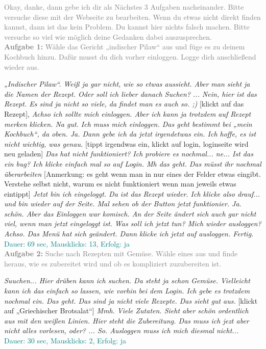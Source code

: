 \documentclass[parskip,10pt,abstracton]{scrartcl}
\begin{document}
\begin{appendix}
\textcolor{gray}{
Okay, danke, dann gebe ich dir als Nächstes 3 Aufgaben nacheinander. Bitte versuche diese mit der Webseite zu bearbeiten. Wenn du etwas nicht direkt finden kannst, dann ist das kein Problem. Du kannst hier nichts falsch machen. Bitte versuche so viel wie möglich deine Gedanken dabei auszusprechen.}\\

\textcolor{gray}{
\textbf{Aufgabe 1:} Wähle das Gericht „indischer Pilaw“ aus und füge es zu deinem Kochbuch hinzu. Dafür musst du dich vorher einloggen. Logge dich anschließend wieder aus.}

\textit{
„Indischer Pilaw“. Weiß ja gar nicht, wie so etwas aussieht. Aber man sieht ja die Namen der Rezept. Oder soll ich lieber danach Suchen? ... Nein, hier ist das Rezept. Es sind ja nicht so viele, da findet man es auch so. ;)} [klickt auf das Rezept], \textit{Achso ich sollte mich einloggen. Aber ich kann ja trotzdem auf Rezept merken klicken. Na gut. Ich muss mich einloggen. Das geht bestimmt bei „mein Kochbuch“, da oben. Ja. Dann gebe ich da jetzt irgendetwas ein. Ich hoffe, es ist nicht wichtig, was genau.} [tippt irgendwas ein, klickt auf login, loginseite wird neu geladen] \textit{Das hat nicht funktioniert? Ich probiere es nochmal... ne... Ist das ein bug? Ich klicke einfach mal so auf Login. Mh das geht. Das müsst ihr nochmal überarbeiten} [Anmerkung: es geht wenn man in nur eines der Felder etwas eingibt. Verstehe selbst nicht, warum es nicht funktioniert wenn man jeweils etwas eintippt] \textit{Jetzt bin ich eingeloggt. Da ist das Rezept wieder. Ich klicke also drauf... und bin wieder auf der Seite. Mal sehen ob der Button jetzt funktionier. Ja. schön. Aber das Einloggen war komisch. An der Seite ändert sich auch gar nicht viel, wenn man jetzt eingeloggt ist. Was soll ich jetzt tun? Mich wieder ausloggen? Achso. Das Menü hat sich geändert. Dann klicke ich jetzt auf ausloggen. Fertig.}\\
\textcolor{teal}{Dauer: 69 sec, Mausklicks: 13, Erfolg: ja}\\


\textcolor{gray}{
\textbf{Aufgabe 2:} Suche nach Rezepten mit Gemüse. Wähle eines aus und finde heraus, wie es zubereitet wird und ob es kompliziert zuzubereiten ist.}

\textit{Suuchen... Hier drüben kann ich suchen. Da steht ja schon Gemüse. Vielleicht kann ich das einfach so lassen, wie vorhin bei dem Login. Ich gebe es trotzdem nochmal ein. Das geht. Das sind ja nicht viele Rezepte. Das sieht gut aus.} [klickt auf „Griechischer Brotsalat“] \textit{Mmh. Viele Zutaten. Sieht aber schön ordentlich aus mit den weißen Linien. Hier steht die Zubereitung. Das muss ich jezt aber nicht alles vorlesen, oder? ... So. Ausloggen muss ich mich diesmal nicht...}\\
\textcolor{teal}{Dauer: 30 sec, Mausklicks: 2, Erfolg: ja}\\



\end{appendix}
\end{document}
